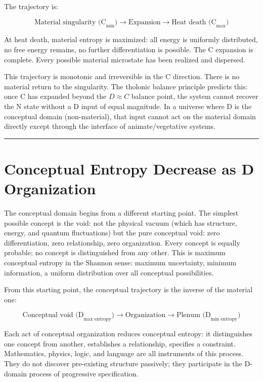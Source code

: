 \documentclass[12pt]{article}
\begin{document}
The trajectory is:

\[\text{Material singularity (C}_\text{min}\text{)} \longrightarrow \text{Expansion} \longrightarrow \text{Heat death (C}_\text{max}\text{)}\]

At heat death, material entropy is maximized: all energy is uniformly
distributed, no free energy remains, no further differentiation is
possible. The C expansion is complete. Every possible material
microstate has been realized and dispersed.

This trajectory is monotonic and irreversible in the C direction. There
is no material return to the singularity. The tholonic balance principle
predicts this: once C has expanded beyond the \(D \approx C\) balance
point, the system cannot recover the N state without a D input of equal
magnitude. In a universe where D is the conceptual domain
(non-material), that input cannot act on the material domain directly
except through the interface of animate/vegetative systems.

\begin{center}\rule{0.5\linewidth}{0.5pt}\end{center}

\section{Conceptual Entropy Decrease as D Organization}\label{conceptual-entropy-decrease-as-d-organization}

The conceptual domain begins from a different starting point. The
simplest possible concept is the void: not the physical vacuum (which
has structure, energy, and quantum fluctuations) but the pure conceptual
void: zero differentiation, zero relationship, zero organization. Every
concept is equally probable; no concept is distinguished from any other.
This is maximum conceptual entropy in the Shannon sense: maximum
uncertainty, minimum information, a uniform distribution over all
conceptual possibilities.

From this starting point, the conceptual trajectory is the inverse of
the material one:

\[\text{Conceptual void (D}_\text{max entropy}\text{)} \longrightarrow \text{Organization} \longrightarrow \text{Plenum (D}_\text{min entropy}\text{)}\]

Each act of conceptual organization reduces conceptual entropy: it
distinguishes one concept from another, establishes a relationship,
specifies a constraint. Mathematics, physics, logic, and language are
all instruments of this process. They do not discover pre-existing
structure passively; they participate in the D-domain process of
progressive specification.
\end{document}
